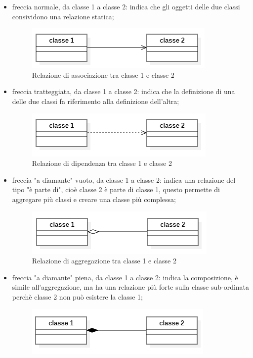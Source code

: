 \begin{itemize}
	\item freccia normale, da classe 1 a classe 2: indica che gli oggetti delle due classi consividono una relazione statica;
	\begin{figure}[H]
		\centering\includegraphics{../immagini/normeUML/frecSempl.png}
		\caption{Relazione di associazione tra classe 1 e classe 2}
	\end{figure}
	 
	\item freccia tratteggiata, da classe 1 a classe 2: indica che la definizione di una delle due classi fa riferimento alla definizione dell'altra;
	\begin{figure}[H]
		\centering\includegraphics{../immagini/normeUML/frecTrat.png}
		\caption{Relazione di dipendenza tra classe 1 e classe 2}
	\end{figure}
	\item freccia "a diamante" vuoto, da classe 1 a classe 2: indica una relazione del tipo "è parte di", cioè classe 2 è parte di classe 1, questo permette di aggregare più classi e creare una classe più complessa;
	\begin{figure}[H]
		\centering\includegraphics{../immagini/normeUML/frecDiamVuot.png}
		\caption{Relazione di aggregazione tra classe 1 e classe 2}
	\end{figure}
	\item freccia "a diamante" piena, da classe 1 a classe 2: indica la composizione, è simile all'aggregazione, ma ha una relazione più forte sulla classe sub-ordinata perchè classe 2 non può esistere la classe 1;
	\begin{figure}[H]
		\centering\includegraphics{../immagini/normeUML/frecDiamPien.png}

\end{figure}
\end{itemize}
